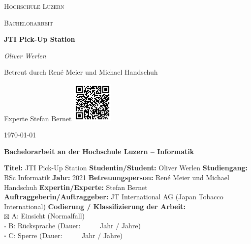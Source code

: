 
		{\scshape\LARGE Hochschule Luzern\par}
		\vspace{1cm}
		{\scshape\Large Bachelorarbeit\par}
		\vspace{1.5cm}
		{\huge\bfseries JTI Pick-Up Station\par}
		\vspace{1.5cm}
		{\Large\itshape Oliver Werlen\par}
		\vfill
		Betreut durch René Meier und Michael Handschuh\par
		Experte Stefan Bernet
		\vfill
		\includegraphics[width=0.15\textwidth]{images/qrMain.png}\par\vspace{1cm}
		{\large \today\par}
	\newpage
	
	\noindent
	\fontsize{12}{14}
	\textbf{Bachelorarbeit an der Hochschule Luzern -- Informatik} \\ \vspace*{0.6cm}
	
	\fontsize{10.5}{12}
	\noindent
	\textbf{Titel:} JTI Pick-Up Station \newline \newline
	\textbf{Studentin/Student:} Oliver Werlen \newline \newline
	\textbf{Studiengang:} BSc Informatik \newline \newline
	\textbf{Jahr:} 2021\newline \newline
	\textbf{Betreuungsperson:} René Meier und Michael Handschuh \newline \newline
	\textbf{Expertin/Experte:} Stefan Bernet \newline \newline
	\textbf{Auftraggeberin/Auftraggeber:} JT International AG (Japan Tobacco International) \newline \newline \newline
	\textbf{Codierung / Klassifizierung der Arbeit:}\\
	$\boxtimes$ A: Einsicht 	(Normalfall) \\
	$\square$ B: R\"ucksprache	(Dauer:  \ \ \ \ \     Jahr / Jahre)\\
	$\square$ C: Sperre	(Dauer:  \ \ \ \ \     Jahr / Jahre)\\
	
